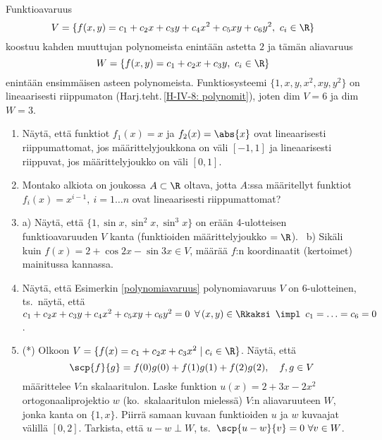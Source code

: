 \begin{Exa} \label{polynomiavaruus}
Funktioavaruus
\[
V=\{f(x,y)=c_1+c_2x+c_3y+c_4x^2+c_5xy+c_6y^2,\ c_i\in\R\}
\]
koostuu kahden muuttujan polynomeista enintään astetta $2$ ja tämän aliavaruus
\[
W=\{f(x,y)=c_1+c_2x+c_3y,\ c_i\in\R\}
\]
enintään ensimmäisen asteen polynomeista. Funktiosysteemi $\{1,x,y,x^2,xy,y^2\}$ on 
lineaarisesti riippumaton (Harj.teht.\,\ref{H-IV-8: polynomit}), joten dim $V=6$ ja dim $W=3$.
\loppu
\end{Exa} 

\Harj
\begin{enumerate}

\item
Näytä, että funktiot $f_1(x)=x$ ja $f_2(x)=\abs{x}$ ovat lineaarisesti riippumattomat, jos
määrittelyjoukkona on väli $[-1,1]$ ja lineaarisesti riippuvat, jos määrittelyjoukko on
väli $[0,1]$.

\item
Montako alkiota on joukossa $A\subset\R$ oltava, jotta $A$:ssa määritellyt funktiot
$f_i(x)=x^{i-1},\ i=1 \ldots n$ ovat lineaarisesti riippumattomat?

\item
a) Näytä, että $\{1,\sin x,\sin^2 x,\sin^3 x\}$ on erään 4-ulotteisen funktioavaruuden
$V$ kanta (funktioiden määrittelyjoukko $=\R$). \ b) Sikäli kuin 
$f(x)=2+\cos 2x-\sin 3x \in V$, määrää $f$:n koordinaatit (kertoimet) mainitussa kannassa.

\item \label{H-IV-8: polynomit}
Näytä, että Esimerkin \ref{polynomiavaruus} polynomiavaruus $V$ on 6-ulotteinen, ts.\ näytä, että
$c_1+c_2x+c_3y+c_4x^2+c_5xy+c_6y^2=0\,\ \forall\,(x,y)\in\Rkaksi\,\ \impl\,\ c_1 = \ldots 
=c_6=0$.

\item (*) Olkoon $V=\{f(x)=c_1+c_2x+c_3x^2 \mid c_i\in\R\}$. Näytä, että
\[
\scp{f}{g}=f(0)g(0)+f(1)g(1)+f(2)g(2), \quad f,g \in V
\]
määrittelee $V$:n skalaaritulon. Laske funktion $u(x)=2+3x-2x^2$ ortogonaaliprojektio $w$ 
(ko.\ skalaaritulon mielessä) $V$:n aliavaruuteen $W$, jonka kanta on $\{1,x\}$. Piirrä samaan
kuvaan funktioiden $u$ ja $w$ kuvaajat välillä $[0,2]$. Tarkista, että $u-w \perp W$, ts.\ 
$\scp{u-w}{v}=0\ \forall v \in W$.

\end{enumerate}